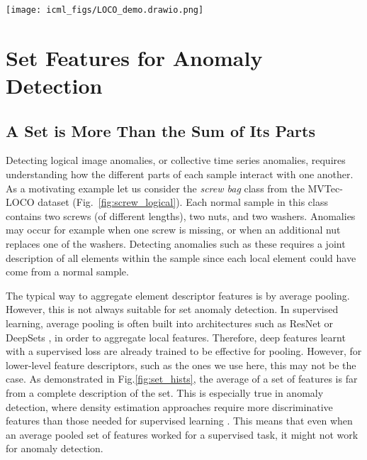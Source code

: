 \documentclass{article}
\begin{document}
\begin{figure*}
    
  \centering
 \texttt{[image: icml\_figs/LOCO\_demo.drawio.png]} \\  
  \caption{  In logical anomalies, each image element (e.g., patch) may be normal even when their combination is anomalous. These cases are challenging as the variation among the normal data can be large while anomalies are fine-grained (e.g., swapping a bolt and a washer in the \textit{screw bag} class). }
  \label{fig:screw_logical}
  \vspace{5pt}
\end{figure*}



\section{Set Features for Anomaly Detection}
\label{sec:method}

\subsection{A Set is More Than the Sum of Its Parts }
\label{subsec:motivation}
Detecting logical image anomalies, or collective time series anomalies, requires understanding how the different parts of each sample interact with one another. As a motivating example let us consider the \textit{screw bag} class from the MVTec-LOCO dataset (Fig.~\ref{fig:screw_logical}). Each normal sample in this class contains two screws (of different lengths), two nuts, and two washers. Anomalies may occur for example when one screw is missing, or when an additional nut replaces one of the washers. Detecting anomalies such as these requires a joint description of all elements within the sample since each local element could have come from a normal sample. 

The typical way to aggregate element descriptor features is by average pooling. However, this is not always suitable for set anomaly detection. In supervised learning, average pooling is often built into architectures such as ResNet \cite{he2016deep} or DeepSets \cite{zaheer2017deep}, in order to aggregate local features. Therefore, deep features learnt with a supervised loss are already trained to be effective for pooling. However, for lower-level feature descriptors, such as the ones we use here, this may not be the case. As demonstrated in Fig.\ref{fig:set_hists}, the average of a set of features is far from a complete description of the set. This is especially true in anomaly detection, where density estimation approaches require more discriminative features than those needed for supervised learning \cite {reiss2022anomaly}. This means that even when an average pooled set of features worked for a supervised task, it might not work for anomaly detection. 
\end{document}
